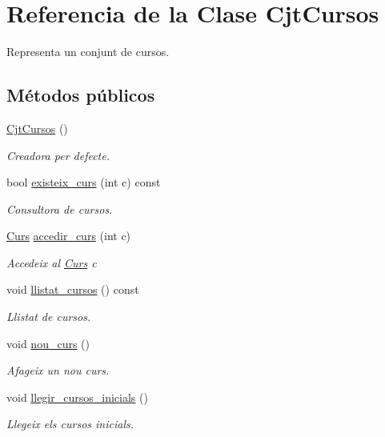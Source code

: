 \hypertarget{class_cjt_cursos}{}\section{Referencia de la Clase Cjt\+Cursos}
\label{class_cjt_cursos}


Representa un conjunt de cursos.  


\subsection*{Métodos públicos}
\begin{DoxyCompactItemize}
\item 
\mbox{\hyperlink{class_cjt_cursos_a0d8729229189d748a8c62033277268ba}{Cjt\+Cursos}} ()
\begin{DoxyCompactList}\small\item\em Creadora per defecte. \end{DoxyCompactList}\item 
bool \mbox{\hyperlink{class_cjt_cursos_ad12b1174de2a5f09cb0c2558645d74dc}{existeix\+\_\+curs}} (int c) const
\begin{DoxyCompactList}\small\item\em Consultora de cursos. \end{DoxyCompactList}\item 
\mbox{\hyperlink{class_curs}{Curs}} \mbox{\hyperlink{class_cjt_cursos_a8aa7b83511051aee39b4942df8e4b2b0}{accedir\+\_\+curs}} (int c)
\begin{DoxyCompactList}\small\item\em Accedeix al \mbox{\hyperlink{class_curs}{Curs}} {\itshape c} \end{DoxyCompactList}\item 
void \mbox{\hyperlink{class_cjt_cursos_a9a772bfad772e507fa9b8f5194b13873}{llistat\+\_\+cursos}} () const
\begin{DoxyCompactList}\small\item\em Llistat de cursos. \end{DoxyCompactList}\item 
void \mbox{\hyperlink{class_cjt_cursos_a3d4778b4572a99e1109d6376f439255e}{nou\+\_\+curs}} ()
\begin{DoxyCompactList}\small\item\em Afageix un nou curs. \end{DoxyCompactList}\item 
void \mbox{\hyperlink{class_cjt_cursos_a970aa3d7caa26ed983ccd71e4bfd0adf}{llegir\+\_\+cursos\+\_\+inicials}} ()
\begin{DoxyCompactList}\small\item\em Llegeix els cursos inicials. \end{DoxyCompactList}\end{DoxyCompactItemize}


